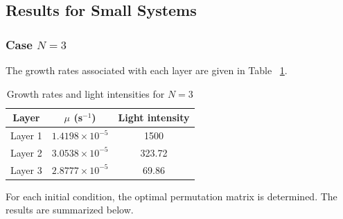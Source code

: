 \documentclass{article}
\begin{document}
\subsection{Results for Small Systems}

\subsubsection{Case $N = 3$}

The growth rates associated with each layer are given in Table ~\ref{tab:mu_N3}.

\begin{table}[H]
\centering
\begin{tabular}{|c|c|c|}
\hline
\textbf{Layer} & \textbf{$\mu$ (s$^{-1}$)} & \textbf{Light intensity} \\
\hline
Layer 1 & $1.4198 \times 10^{-5}$ & 1500 \\
Layer 2 & $3.0538 \times 10^{-5}$ & 323.72 \\
Layer 3 & $2.8777 \times 10^{-5}$ & 69.86 \\
\hline
\end{tabular}
\caption{Growth rates and light intensities for $N=3$}
\label{tab:mu_N3}
\end{table}

For each initial condition, the optimal permutation matrix is determined.
The results are summarized below.
\end{document}

